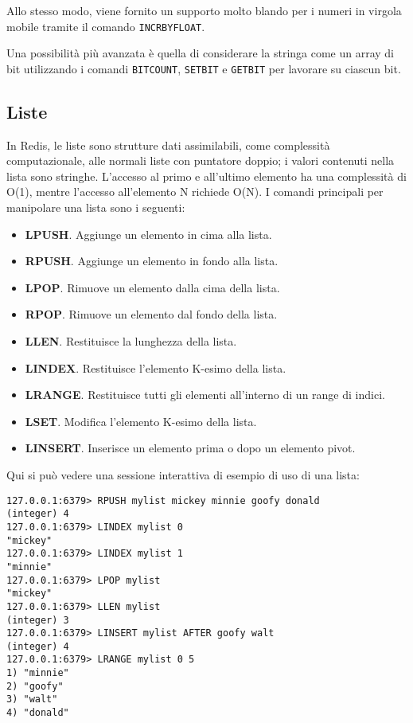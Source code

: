 Allo stesso modo, viene fornito un supporto molto blando per i numeri in virgola
mobile tramite il comando \verb|INCRBYFLOAT|.

Una possibilità più avanzata è quella di considerare la stringa come un array di bit
utilizzando i comandi \verb|BITCOUNT|, \verb|SETBIT| e \verb|GETBIT| per lavorare
su ciascun bit.

\subsection{Liste}

In Redis, le liste sono strutture dati assimilabili, come complessità computazionale,
alle normali liste con puntatore doppio; i valori contenuti nella lista sono stringhe.
L'accesso al primo e all'ultimo elemento ha una complessità di O(1), mentre
l'accesso all'elemento N richiede O(N). I comandi principali per manipolare una
lista sono i seguenti:

\begin{itemize}
	\medskip
	\item \textbf{LPUSH}. Aggiunge un elemento in cima alla lista.
	\item \textbf{RPUSH}. Aggiunge un elemento in fondo alla lista.
	\item \textbf{LPOP}. Rimuove un elemento dalla cima della lista.
	\item \textbf{RPOP}. Rimuove un elemento dal fondo della lista.
	\item \textbf{LLEN}. Restituisce la lunghezza della lista.
	\item \textbf{LINDEX}. Restituisce l'elemento K-esimo della lista.
	\item \textbf{LRANGE}. Restituisce tutti gli elementi all'interno di un range di indici.
	\item \textbf{LSET}. Modifica l'elemento K-esimo della lista.
	\item \textbf{LINSERT}. Inserisce un elemento prima o dopo un elemento pivot.
\end{itemize}

Qui si può vedere una sessione interattiva di esempio di uso di una lista:

\medskip
\begin{lstlisting}
127.0.0.1:6379> RPUSH mylist mickey minnie goofy donald
(integer) 4
127.0.0.1:6379> LINDEX mylist 0
"mickey"
127.0.0.1:6379> LINDEX mylist 1
"minnie"
127.0.0.1:6379> LPOP mylist
"mickey"
127.0.0.1:6379> LLEN mylist
(integer) 3
127.0.0.1:6379> LINSERT mylist AFTER goofy walt
(integer) 4
127.0.0.1:6379> LRANGE mylist 0 5
1) "minnie"
2) "goofy"
3) "walt"
4) "donald"
\end{lstlisting}

